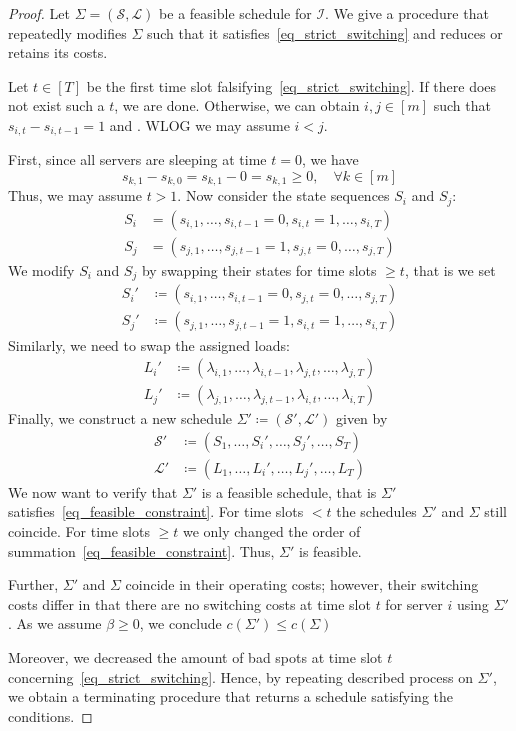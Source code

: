 \documentclass[hidelinks]{article}
\theoremstyle{plain}
\theoremstyle{definition}
\theoremstyle{rem}
\newcommand{\inp}{\mathcal{I}}
\begin{document}
\begin{proof}
Let $\Sigma=(\mathcal{S},\mathcal{L})$ be a feasible schedule for $\inp$. We give a procedure that repeatedly modifies $\Sigma$ such that it satisfies~\eqref{eq_strict_switching} and reduces or retains its costs. 
	
Let $t\in[T]$ be the first time slot falsifying~\eqref{eq_strict_switching}. If there does not exist such a $t$, we are done. Otherwise, we can obtain $i,j\in[m]$ such that $s_{i,t}-s_{i,t-1}=1$ and . WLOG we may assume $i<j$. 
	
First, since all servers are sleeping at time $t=0$, we have
\begin{equation*}
	s_{k,1}-s_{k,0}=s_{k,1}-0=s_{k,1}\ge 0,\quad\forall k\in[m]
\end{equation*}
Thus, we may assume $t>1$. Now consider the state sequences $S_i$ and $S_j$:
\begin{align*}
	S_i&=(s_{i,1},\ldots,s_{i,t-1}=0,s_{i,t}=1,\ldots,s_{i,T})\\
	S_j&=(s_{j,1},\ldots,s_{j,t-1}=1,s_{j,t}=0,\ldots,s_{j,T})
\end{align*}
We modify $S_i$ and $S_j$ by swapping their states for time slots $\ge t$, that is we set
\begin{align*}
	S_i'&\coloneqq(s_{i,1},\ldots,s_{i,t-1}=0,s_{j,t}=0,\ldots,s_{j,T})\\
	S_j'&\coloneqq(s_{j,1},\ldots,s_{j,t-1}=1,s_{i,t}=1,\ldots,s_{i,T})
\end{align*}
Similarly, we need to swap the assigned loads:
\begin{align*}
	L_i'&\coloneqq(\lambda_{i,1},\ldots,\lambda_{i,t-1},\lambda_{j,t},\ldots,\lambda_{j,T})\\
	L_j'&\coloneqq(\lambda_{j,1},\ldots,\lambda_{j,t-1},\lambda_{i,t},\ldots,\lambda_{i,T})
\end{align*}
Finally, we construct a new schedule $\Sigma'\coloneqq(\mathcal{S}',\mathcal{L}')$ given by 
\begin{align*}
	\mathcal{S}'&\coloneqq(S_1,\ldots,S_i',\ldots,S_j',\ldots,S_T)\\
	\mathcal{L}'&\coloneqq(L_1,\ldots,L_i',\ldots,L_j',\ldots,L_T)
\end{align*}
We now want to verify that $\Sigma'$ is a feasible schedule, that is $\Sigma'$ satisfies~\eqref{eq_feasible_constraint}. For time slots $<t$ the schedules $\Sigma'$ and $\Sigma$ still coincide. For time slots $\ge t$ we only changed the order of summation~\eqref{eq_feasible_constraint}. Thus, $\Sigma'$ is feasible.

Further, $\Sigma'$ and $\Sigma$ coincide in their operating costs; however, their switching costs differ in that there are no switching costs at time slot $t$ for server $i$ using $\Sigma'$. As we assume $\beta\ge0$, we conclude $c(\Sigma')\le c(\Sigma)$

Moreover, we decreased the amount of bad spots at time slot $t$ concerning~\eqref{eq_strict_switching}. Hence, by repeating described process on $\Sigma'$, we obtain a terminating procedure that returns a schedule satisfying the conditions.
\end{proof}
\end{document}
